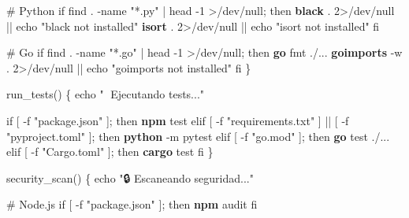 \documentclass[
  11pt,
  letterpaper,
  oneside,
  openany]{scrbook}
\newenvironment{Shaded}{}{}
\newcommand{\AttributeTok}[1]{\textcolor[rgb]{0.84,0.23,0.29}{#1}}
\newcommand{\BuiltInTok}[1]{\textcolor[rgb]{0.84,0.23,0.29}{#1}}
\newcommand{\CommentTok}[1]{\textcolor[rgb]{0.42,0.45,0.49}{#1}}
\newcommand{\ControlFlowTok}[1]{\textcolor[rgb]{0.84,0.23,0.29}{#1}}
\newcommand{\DecValTok}[1]{\textcolor[rgb]{0.00,0.36,0.77}{#1}}
\newcommand{\ExtensionTok}[1]{\textcolor[rgb]{0.84,0.23,0.29}{\textbf{#1}}}
\newcommand{\FunctionTok}[1]{\textcolor[rgb]{0.44,0.26,0.76}{#1}}
\newcommand{\KeywordTok}[1]{\textcolor[rgb]{0.84,0.23,0.29}{#1}}
\newcommand{\NormalTok}[1]{\textcolor[rgb]{0.14,0.16,0.18}{#1}}
\newcommand{\OperatorTok}[1]{\textcolor[rgb]{0.14,0.16,0.18}{#1}}
\newcommand{\OtherTok}[1]{\textcolor[rgb]{0.44,0.26,0.76}{#1}}
\newcommand{\StringTok}[1]{\textcolor[rgb]{0.01,0.18,0.38}{#1}}
\begin{document}
\begin{Shaded}
\begin{Highlighting}[]
    \CommentTok{\# Python}
    \ControlFlowTok{if} \FunctionTok{find}\NormalTok{ . }\AttributeTok{{-}name} \StringTok{"*.py"} \KeywordTok{|} \FunctionTok{head} \AttributeTok{{-}1} \OperatorTok{\textgreater{}}\NormalTok{/dev/null}\KeywordTok{;} \ControlFlowTok{then}
        \ExtensionTok{black}\NormalTok{ . }\DecValTok{2}\OperatorTok{\textgreater{}}\NormalTok{/dev/null }\KeywordTok{||} \BuiltInTok{echo} \StringTok{"black not installed"}
        \ExtensionTok{isort}\NormalTok{ . }\DecValTok{2}\OperatorTok{\textgreater{}}\NormalTok{/dev/null }\KeywordTok{||} \BuiltInTok{echo} \StringTok{"isort not installed"}
    \ControlFlowTok{fi}
    
    \CommentTok{\# Go}
    \ControlFlowTok{if} \FunctionTok{find}\NormalTok{ . }\AttributeTok{{-}name} \StringTok{"*.go"} \KeywordTok{|} \FunctionTok{head} \AttributeTok{{-}1} \OperatorTok{\textgreater{}}\NormalTok{/dev/null}\KeywordTok{;} \ControlFlowTok{then}
        \ExtensionTok{go}\NormalTok{ fmt ./...}
        \ExtensionTok{goimports} \AttributeTok{{-}w}\NormalTok{ . }\DecValTok{2}\OperatorTok{\textgreater{}}\NormalTok{/dev/null }\KeywordTok{||} \BuiltInTok{echo} \StringTok{"goimports not installed"}
    \ControlFlowTok{fi}
\KeywordTok{\}}

\FunctionTok{run\_tests()} \KeywordTok{\{}
    \BuiltInTok{echo} \StringTok{"🧪 Ejecutando tests..."}
    
    \ControlFlowTok{if} \BuiltInTok{[} \OtherTok{{-}f} \StringTok{"package.json"} \BuiltInTok{]}\KeywordTok{;} \ControlFlowTok{then}
        \ExtensionTok{npm}\NormalTok{ test}
    \ControlFlowTok{elif} \BuiltInTok{[} \OtherTok{{-}f} \StringTok{"requirements.txt"} \BuiltInTok{]} \KeywordTok{||} \BuiltInTok{[} \OtherTok{{-}f} \StringTok{"pyproject.toml"} \BuiltInTok{]}\KeywordTok{;} \ControlFlowTok{then}
        \ExtensionTok{python} \AttributeTok{{-}m}\NormalTok{ pytest}
    \ControlFlowTok{elif} \BuiltInTok{[} \OtherTok{{-}f} \StringTok{"go.mod"} \BuiltInTok{]}\KeywordTok{;} \ControlFlowTok{then}
        \ExtensionTok{go}\NormalTok{ test ./...}
    \ControlFlowTok{elif} \BuiltInTok{[} \OtherTok{{-}f} \StringTok{"Cargo.toml"} \BuiltInTok{]}\KeywordTok{;} \ControlFlowTok{then}
        \ExtensionTok{cargo}\NormalTok{ test}
    \ControlFlowTok{fi}
\KeywordTok{\}}

\FunctionTok{security\_scan()} \KeywordTok{\{}
    \BuiltInTok{echo} \StringTok{"🔒 Escaneando seguridad..."}
    
    \CommentTok{\# Node.js}
    \ControlFlowTok{if} \BuiltInTok{[} \OtherTok{{-}f} \StringTok{"package.json"} \BuiltInTok{]}\KeywordTok{;} \ControlFlowTok{then}
        \ExtensionTok{npm}\NormalTok{ audit}
    \ControlFlowTok{fi}
    

\end{Highlighting}
\end{Shaded}
\end{document}

